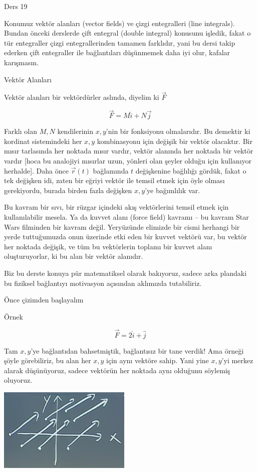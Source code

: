 \documentclass[12pt,fleqn]{article}\usepackage{../../common}
\begin{document}
Ders 19

Konumuz vektör alanları (vector fields) ve çizgi entegralleri (line
integrals). Bundan önceki derslerde çift entegral (double integral)
konusunu işledik, fakat o tür entegraller çizgi entegrallerinden tamamen
farklıdır, yani bu dersi takip ederken çift entegraller ile bağlantıları
düşünmemek daha iyi olur, kafalar karışmasın. 

Vektör Alanları

Vektör alanları bir vektördürler aslında, diyelim ki $\vec{F}$

$$ \vec{F} = M\hat{i} + N\vec{j} $$

Farklı olan $M,N$ kendilerinin $x,y$'nin bir fonksiyonu olmalarıdır. Bu
demektir ki kordinat sistemindeki her $x,y$ kombinasyonu için değişik bir
vektör olacaktır. Bir mısır tarlasında her noktada mısır vardır, vektör
alanında her noktada bir vektör vardır [hoca bu analojiyi mısırlar uzun,
yönleri olan şeyler olduğu için kullanıyor herhalde]. Daha önce
$\vec{r}(t)$ bağlamında $t$ değişkenine bağlılığı gördük, fakat o tek
değişken idi, zaten bir eğriyi vektör ile temsil etmek için öyle olması
gerekiyordu, burada birden fazla değişken $x,y$'ye bağımlılık var. 

Bu kavram bir sıvı, bir rüzgar içindeki akış vektörlerini temsil etmek için
kullanılabilir mesela. Ya da kuvvet alanı (force field) kavramı -- bu
kavram Star Wars filminden bir kavram değil. Yeryüzünde elimizde bir cismi
herhangi bir yerde tuttuğumuzda onun üzerinde etki eden bir kuvvet vektörü
var, bu vektör her noktada değişik, ve tüm bu vektörlerin toplamı bir
kuvvet alanı oluşturuyorlar, ki bu alan bir vektör alanıdır. 

Biz bu derste konuya pür matematiksel olarak bakıyoruz, sadece arka
plandaki bu fiziksel bağlantıyı motivasyon açısından aklımızda
tutabiliriz. 

Önce çizimden başlayalım

Örnek

$$ \vec{F} = 2\hat{i} + \hat{j} $$

Tam $x,y$'ye bağlantıdan bahsetmiştik, bağlantısız bir tane verdik! Ama
örneği şöyle görebiliriz, bu alan her $x,y$ için aynı vektöre sahip. Yani
yine $x,y$'yi merkez alarak düşünüyoruz, sadece vektörün her noktada aynı
olduğunu söylemiş oluyoruz.

\includegraphics[height=4cm]{19_1.png}
\end{document}
